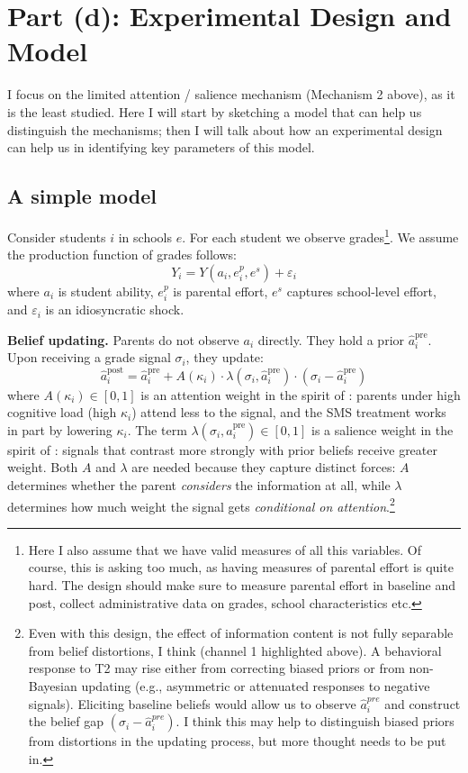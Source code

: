\documentclass[11pt]{article}
\begin{document}
\section{Part (d): Experimental Design and Model}

I focus on the limited attention / salience mechanism (Mechanism 2 above), as it is the least studied. Here I will start by sketching a model that can help us distinguish the mechanisms; then I will talk about how an experimental design can help us in identifying key parameters of this model. 

\subsection{A simple model}

Consider students $i$ in schools $e$. For each student we observe grades\footnote{Here I also assume that we have valid measures of all this variables. Of course, this is asking too much, as having measures of parental effort is quite hard. The design should make sure to measure parental effort in baseline and post, collect administrative data on grades, school characteristics etc.}. We assume the production function of grades follows:
\[
Y_{i} = Y(a_{i}, e_{i}^{p}, e^{s}) + \varepsilon_{i}
\]
where $a_i$ is student ability, $e_i^p$ is parental effort, $e^s$ captures school-level effort, 
and $\varepsilon_i$ is an idiosyncratic shock.

\medskip
\noindent \textbf{Belief updating.} Parents do not observe $a_i$ directly. They hold a prior 
$\hat{a}_{i}^{\text{pre}}$. Upon receiving a grade signal $\sigma_i$, they update:
\[
\hat{a}_{i}^{\text{post}} = \hat{a}_{i}^{\text{pre}} 
  + A(\kappa_i) \cdot \lambda(\sigma_i, \hat{a}_{i}^{\text{pre}}) 
  \cdot (\sigma_i - \hat{a}_{i}^{\text{pre}})
\]
where $A(\kappa_i) \in [0,1]$ is an attention weight in the spirit of \citet{gabaix2014sparsity}: 
parents under high cognitive load (high $\kappa_i$) attend less to the signal, and the 
SMS treatment works in part by lowering $\kappa_i$. The term $\lambda(\sigma_i, 
\hat{a}_{i}^{\text{pre}}) \in [0,1]$ is a salience weight in the spirit of \citet{bordalo2012salience}: signals that contrast more strongly with prior beliefs 
receive greater weight. Both $A$ and $\lambda$ are needed because they capture distinct 
forces: $A$ determines whether the parent \emph{considers} the information at all, 
while $\lambda$ determines how much weight the signal gets \emph{conditional on attention}.\footnote{Even with this design, the effect of information content is not fully separable from belief distortions, I think (channel 1 highlighted above). A behavioral response to T2 may rise either from correcting biased priors or from non-Bayesian updating (e.g., asymmetric or attenuated responses to negative signals). Eliciting baseline beliefs would allow us to observe $\hat a_i^{pre}$ and construct the belief gap $(\sigma_i - \hat a_i^{pre})$. I think this may help to distinguish biased priors from distortions in the updating process, but more thought needs to be put in. 
}
\end{document}
